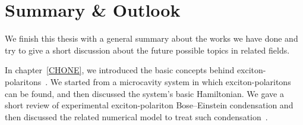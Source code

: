 \chapter{Summary \& Outlook}\label{Ch7}
We finish this thesis with a general summary about the works we have done and try to give a short discussion about the future possible topics in related fields.

In chapter~\ref{CHONE}, we introduced the basic concepts behind exciton-polaritons~\cite{Deng:2010aa,Kavokin:2007aa,Shelykh:2009aa,Bramati:2013aa}.
We started from a microcavity system in which exciton-polaritons can be found, and then discussed the system's basic Hamiltonian.
We gave a short review of experimental exciton-polariton Bose--Einstein condensation and then discussed the related numerical model to treat such condensation~\cite{Carusotto:2013aa,Keeling:2008js,Wouters:2007aa}.

